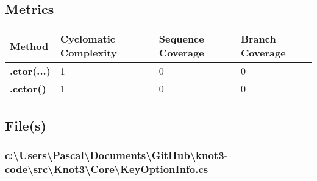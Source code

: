 \documentclass[a4paper,10pt]{article}
\begin{document}
\subsection{Metrics}
\begin{longtable}[l]{|l|l|l|l|}
\hline
\textbf{Method} & \textbf{Cyclomatic Complexity} & \textbf{Sequence Coverage} & \textbf{Branch Coverage}\\
\hline
\textbf{.ctor(...)} & 1 & 0 & 0\\
\hline
\textbf{.cctor()} & 1 & 0 & 0\\
\hline
\end{longtable}
\subsection{File(s)}
\subsubsection{c:\textbackslash Users\textbackslash Pascal\textbackslash Documents\textbackslash GitHub\textbackslash knot3-code\textbackslash src\textbackslash Knot3\textbackslash Core\textbackslash KeyOptionInfo.cs}
\end{document}
